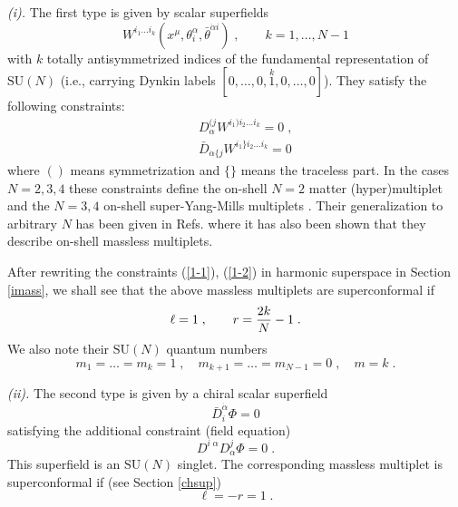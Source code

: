 \documentclass[a4paper,12pt]{article}
\begin{document}
{\it (i).} The first type is given by scalar superfields 
\begin{equation}\label{4.1}
  W^{i_1\ldots 
i_k}(x^\mu, \theta^\alpha_i,\bar\theta^{\dot\alpha i})\;, \qquad 
k=1,\ldots, N-1 
\end{equation}
with $k$ totally antisymmetrized indices of the fundamental 
representation of $\mbox{SU}(N)$ (i.e., carrying Dynkin labels 
$[0,\ldots,0,\stackrel{k}{1},0,\ldots,0]$). They satisfy the 
following constraints: 
\begin{eqnarray}
  &&D^{(j}_\alpha W^{i_1)i_2\ldots i_k}=0\;, \label{1-1}\\
  &&\bar D_{\dot\alpha \{j}W^{i_1\}i_2\ldots i_k}=0  \label{1-2} 
\end{eqnarray}
where $()$ means symmetrization and $\{\}$ means the traceless 
part. In the cases $N=2,3,4$  these constraints define the 
on-shell $N=2$ matter (hyper)multiplet \cite{Sohnius} and the 
$N=3,4$ on-shell super-Yang-Mills multiplets \cite{So}. Their 
generalization to arbitrary $N$ has been given in Refs. 
\cite{Siegel,HST} where it has also been shown that they describe 
on-shell massless multiplets. 

After rewriting the constraints (\ref{1-1}), (\ref{1-2}) in 
harmonic superspace in Section \ref{imass}, we shall see that the 
above massless multiplets are superconformal if 
\begin{equation}\label{4.1.1}
  \ell=1\;, \qquad r ={2k\over N}-1\;.
\end{equation}
We also note their $\mbox{SU}(N)$ quantum numbers
\begin{equation}\label{4.1.2}
  m_1=\ldots=m_k=1\;, \quad m_{k+1}=\ldots=m_{N-1}=0\;, \quad 
m=k\;.
\end{equation}
 
   

{\it (ii).} The second type is given by a chiral scalar superfield 
\begin{equation}\label{4.2}
  \bar D_i^{\dot\alpha}\Phi=0
\end{equation}
satisfying the additional constraint (field equation)
\begin{equation}\label{4.3}
  D^{i\;\alpha}D^j_\alpha \Phi=0\;.
\end{equation}
This superfield is an $\mbox{SU}(N)$ singlet. The corresponding 
massless multiplet is superconformal if (see Section \ref{chsup}) 
\begin{equation}\label{4.4}
  \ell=-r=1\;.
\end{equation}
\end{document}
